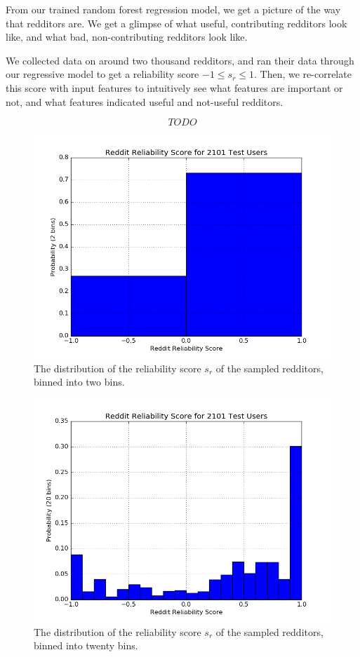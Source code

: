 From our trained random forest regression model, we get a picture of the way
that redditors are. We get a glimpse of what useful, contributing redditors look
like, and what bad, non-contributing redditors look like.

We collected data on around two thousand redditors, and ran their data through
our regressive model to get a reliability score $-1 \leq s_r \leq 1$. Then, we
re-correlate this score with input features to intuitively see what features are
important or not, and what features indicated useful and not-useful redditors.

\[ TODO \]

\begin{figure}[tb]
    \centering
    \includegraphics[width=\linewidth]{figures/data_2.png}
    \caption{The distribution of the reliability score $s_r$ of the sampled redditors, binned into two bins.}
    \label{fig:data_2}
\end{figure}

\begin{figure}[tb]
    \centering
    \includegraphics[width=\linewidth]{figures/data_20.png}
    \caption{The distribution of the reliability score $s_r$ of the sampled redditors, binned into twenty bins.}
    \label{fig:data_20}
\end{figure}

